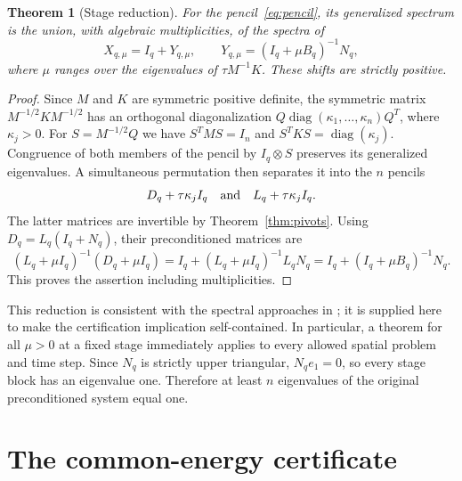\documentclass[11pt,letterpaper]{article}
\newtheorem{theorem}{Theorem}[section]
\theoremstyle{remark}
\newcommand{\Id}{I}
\begin{document}
\begin{theorem}[Stage reduction]\label{thm:reduction}
For the pencil~\eqref{eq:pencil}, its generalized spectrum is the union,
with algebraic multiplicities, of the spectra of
\begin{equation}\label{eq:X}
 X_{q,\mu}=\Id_q+Y_{q,\mu},\qquad
 Y_{q,\mu}=(\Id_q+\mu B_q)^{-1}N_q,
\end{equation}
where \(\mu\) ranges over the eigenvalues of \(\tau M^{-1}K\). These shifts
are strictly positive.
\end{theorem}
\begin{proof}
Since \(M\) and \(K\) are symmetric positive definite, the symmetric matrix
\(M^{-1/2}KM^{-1/2}\) has an orthogonal diagonalization
\(Q\operatorname{diag}(\kappa_1,\ldots,\kappa_n)Q^T\), where \(\kappa_j>0\).
For \(S=M^{-1/2}Q\) we have
\(S^TMS=\Id_n\) and \(S^TKS=\operatorname{diag}(\kappa_j)\).
Congruence of both members of the pencil by \(\Id_q\otimes S\) preserves
its generalized eigenvalues. A simultaneous permutation then separates it
into the \(n\) pencils
\[
 D_q+\tau\kappa_j\Id_q\quad\hbox{and}\quad L_q+\tau\kappa_j\Id_q.
\]
The latter matrices are invertible by Theorem~\ref{thm:pivots}. Using
\(D_q=L_q(\Id_q+N_q)\), their preconditioned matrices are
\[
 (L_q+\mu\Id_q)^{-1}(D_q+\mu\Id_q)
 =\Id_q+(L_q+\mu\Id_q)^{-1}L_qN_q
 =\Id_q+(\Id_q+\mu B_q)^{-1}N_q.
\]
This proves the assertion including multiplicities.
\end{proof}

This reduction is consistent with the spectral approaches in
\cite{dravi,out}; it is supplied here to make the certification implication
self-contained. In particular, a theorem for all \(\mu>0\) at a fixed stage
immediately applies to every allowed spatial problem and time step. Since
\(N_q\) is strictly upper triangular, \(N_qe_1=0\), so every stage block has
an eigenvalue one. Therefore at least \(n\) eigenvalues of the original
preconditioned system equal one.

\section{The common-energy certificate}
\end{document}
